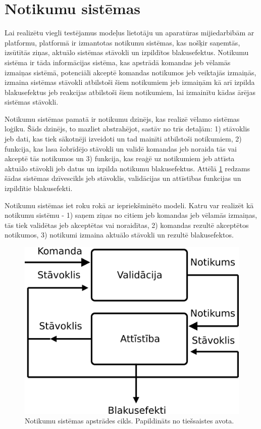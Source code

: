 \section{Notikumu sistēmas}
\label{sec:eventsourcing}

Lai realizētu viegli testējamus  modeļus lietotāju un
aparatūras mijiedarbībām ar platformu, platformā ir izmantotas notikumu
sistēmas, kas nošķir saņemtās, izsūtītās ziņas, aktuālo sistēmas stāvokli un
izpildītos blakusefektus. Notikumu sistēma ir tāda informācijas sistēma, kas
apstrādā komandas jeb vēlamās izmaiņas sistēmā, potenciāli akceptē komandas
notikumos jeb veiktajās izmaiņās, izmaina sistēmas stāvokli atbilstoši šiem
notikumiem jeb izmaiņām kā arī izpilda blakusefektus jeb reakcijas atbilstoši
šiem notikumiem, lai izmainītu kādas ārējas sistēmas stāvokli.
\cite[para. 3.2.3]{JohnsenEspen2018}

Notikumu sistēmas pamatā ir notikumu dzinējs, kas realizē vēlamo sistēmas
loģiku. Šāds dzinējs, to mazliet abstrahējot, sastāv no trīs detaļām: 1)
stāvoklis jeb dati, kas tiek sākotnēji izveidoti un tad mainīti atbilstoši
notikumiem, 2) funkcija, kas lasa šobrīdējo stāvokli un validē komandas jeb
noraida tās vai akceptē tās notikumos un 3) funkcija, kas reaģē uz notikumiem
jeb attīsta aktuālo stāvokli jeb datus un izpilda notikumu blakusefektus. Attēlā
\ref{fig:eventengine} redzams šādas sistēmas dzīvescikls jeb stāvoklis,
validācijas un attīstības funkcijas un izpildītie blakusefekti.

Notikumu sistēmas iet roku rokā ar iepriekšminēto 
modeli. Katru  var realizēt kā notikumu sistēmu - 1)
 saņem ziņas no citiem  jeb
komandas jeb vēlamās izmaiņas, tās tiek validētas jeb akceptētas vai noraidītas,
2) komandas rezultē akceptētos notikumos, 3) notikumi izmaina aktuālo stāvokli
un rezultē blakusefektos. 

\begin{figure}[H]
    \includegraphics[width=0.5\linewidth]{assets/event-sourcing-decider.png}
    \centering
    \caption{Notikumu sistēmas apstrādes cikls. Papildināts no tiešsaistes avota. \cite{JeremieChassaing2021}}
    \label{fig:eventengine}
\end{figure}

